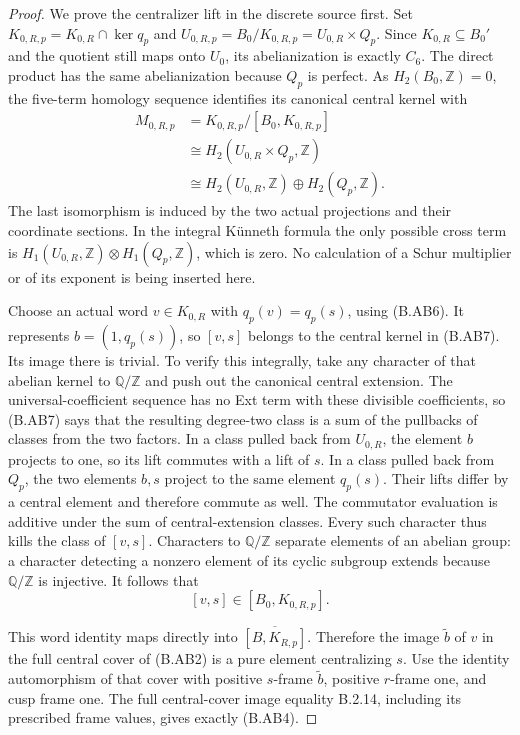 \begin{proof}
We prove the centralizer lift in the discrete source
first.  Set $K_{0,R,p}=K_{0,R}\cap\ker q_p$ and
$U_{0,R,p}=B_0/K_{0,R,p}=U_{0,R}\times Q_p$.
Since $K_{0,R}\subseteq B_0'$ and the quotient still
maps onto $U_0$, its abelianization is exactly $C_6$.
The direct product has the same abelianization because
$Q_p$ is perfect.  As $H_2(B_0,\mathbb Z)=0$, the
five-term homology sequence identifies its canonical
central kernel with
\[
 \begin{aligned}
 M_{0,R,p}
   &=K_{0,R,p}/[B_0,K_{0,R,p}]\\
   &\cong H_2(U_{0,R}\times Q_p,\mathbb Z)\\
   &\cong H_2(U_{0,R},\mathbb Z)\oplus H_2(Q_p,\mathbb Z).
 \end{aligned}
 \tag{B.AB7}
\]
The last isomorphism is induced by the two actual
projections and their coordinate sections.  In the
integral K\"unneth formula the only possible cross
term is $H_1(U_{0,R},\mathbb Z)\otimes H_1(Q_p,\mathbb Z)$,
which is zero.  No calculation of a Schur multiplier
or of its exponent is being inserted here.

Choose an actual word $v\in K_{0,R}$ with
$q_p(v)=q_p(s)$, using (B.AB6).  It represents
$b=(1,q_p(s))$, so $[v,s]$ belongs to the central
kernel in (B.AB7).  Its image there is trivial.
To verify this integrally, take any character of that
abelian kernel to $\mathbb Q/\mathbb Z$ and push out
the canonical central extension.  The universal-coefficient
sequence has no Ext term with these divisible
coefficients, so (B.AB7) says that the resulting
degree-two class is a sum of the pullbacks of classes
from the two factors.  In a class pulled back from
$U_{0,R}$, the element $b$ projects to one, so its
lift commutes with a lift of $s$.  In a class pulled
back from $Q_p$, the two elements $b,s$ project to
the same element $q_p(s)$.  Their lifts differ by a
central element and therefore commute as well.
The commutator evaluation is additive under the
sum of central-extension classes.  Every such
character thus kills the class of $[v,s]$.
Characters to $\mathbb Q/\mathbb Z$ separate elements
of an abelian group: a character detecting a
nonzero element of its cyclic subgroup extends
because $\mathbb Q/\mathbb Z$ is injective.
It follows that
\[
                         [v,s]\in[B_0,K_{0,R,p}].
 \tag{B.AB8}
\]

This word identity maps directly into
$\overline{[B,K_{R,p}]}$.  Therefore the image
$\widetilde b$ of $v$ in the full central cover
of (B.AB2) is a pure element centralizing $s$.
Use the identity automorphism of that cover with
positive $s$-frame $\widetilde b$, positive
$r$-frame one, and cusp frame one.
The full central-cover image equality B.2.14,
including its prescribed frame values, gives
exactly (B.AB4).


\end{proof}
